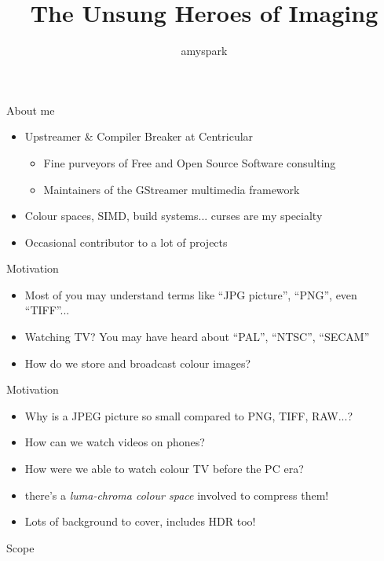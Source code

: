 \documentclass[aspectratio=169,handout]{fireshonks}
\title{The Unsung Heroes of Imaging}
\author{amyspark}
\date{\DTMdate{2023-12-27}}
\begin{document}
\maketitle

\begin{frame}{About me}
    \begin{itemize}[<*>]
        \item Upstreamer \& Compiler Breaker at Centricular
              \begin{itemize}[<*>]
                  \item Fine purveyors of Free and Open Source Software consulting
                  \item Maintainers of the GStreamer multimedia framework
              \end{itemize}
        \item Colour spaces, SIMD, build systems... curses are my specialty 
        \item Occasional contributor to a lot of projects
    \end{itemize}
\end{frame}
\begin{frame}{Motivation}
    \begin{itemize}
        \item Most of you may understand terms like \enquote{JPG picture}, \enquote{PNG}, even \enquote{TIFF}...
        \item Watching TV? You may have heard about \enquote{PAL}, \enquote{NTSC}, \enquote{SECAM}
        \item How do we store and broadcast colour images?
    \end{itemize}
\end{frame}

\begin{frame}{Motivation}
    \begin{itemize}
        \item Why is a JPEG picture so small compared to PNG, TIFF, RAW...?
        \item How can we watch  videos on phones?
        \item How were we able to watch colour TV before the PC era?
        \item {} there's a \emph{luma-chroma colour space} involved to compress them!
        \item Lots of background to cover, includes HDR too!
    \end{itemize}
\end{frame}
\begin{frame}{Scope}
    \tableofcontents
\end{frame}
\end{document}
